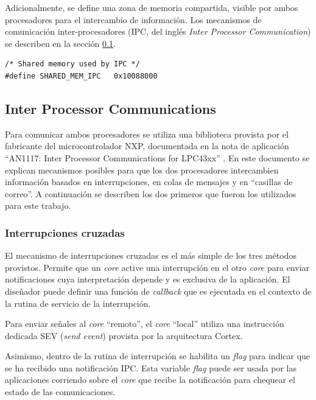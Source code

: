Adicionalmente, se define una zona de memoria compartida, visible por ambos procesadores para el intercambio de información. Los mecanismos de comunicación inter-procesadores (IPC, del inglés \textit{Inter Processor Communication}) se describen en la sección \ref{subsec:IPC}. 

\begin{verbatim}
/* Shared memory used by IPC */
#define SHARED_MEM_IPC   0x10088000	 
\end{verbatim}

\subsection{Inter Processor Communications}
\label{subsec:IPC}

Para comunicar ambos procesadores se utiliza una biblioteca provista por el fabricante del microcontrolador NXP, documentada en la nota de aplicación ``AN1117: Inter Processor Communications for LPC43xx'' \citep{nxp:an1117}. En este documento se explican mecanismos posibles para que los dos procesadores intercambien información basados en interrupciones, en colas de mensajes y en ``casillas de correo''.  A continuación se describen los dos primeros que fueron los utilizados para este trabajo.

\subsubsection{Interrupciones cruzadas}
\label{subsubsec:interrupcion}

El mecanismo de interrupciones cruzadas es el más simple de los tres métodos provistos.  Permite que un \textit{core} active una interrupción en el otro \textit{core} para enviar notificaciones cuya interpretación depende y es exclusiva de la aplicación.  El diseñador puede definir una función de \textit{callback} que es ejecutada en el contexto de la rutina de servicio de la interrupción.  

Para enviar señales al \textit{core} ``remoto'', el \textit{core} ``local'' utiliza una instrucción dedicada SEV (\textit{send event}) provista por la arquitectura Cortex.

Asimismo, dentro de la rutina de interrupción se habilita un \textit{flag} para indicar que se ha recibido una notificación IPC.  Esta variable \textit{flag} puede ser usada por las aplicaciones corriendo sobre el \textit{core} que recibe la notificación para chequear el estado de las comunicaciones. 

